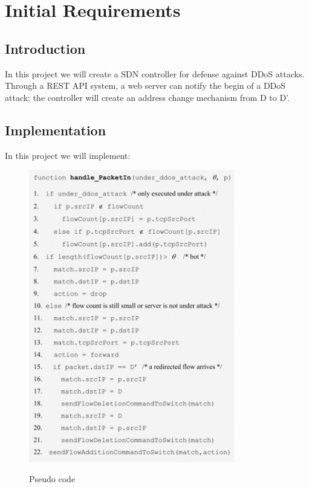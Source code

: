 \chapter{Initial Requirements}

\section{Introduction}
In this project we will create a SDN controller for defense against DDoS attacks. Through a REST API system, a web server can notify the begin of a DDoS attack; the controller will create an address change mechanism from D to D’.

\section{Implementation}
In this project we will implement:
\begin{figure}[H]
\begin{center}
\includegraphics[width=0.8\textwidth]{images/PseudoCode.png}
\label{fig:pseudocode}
\caption{Pseudo code}
\end{center}
\end{figure}

